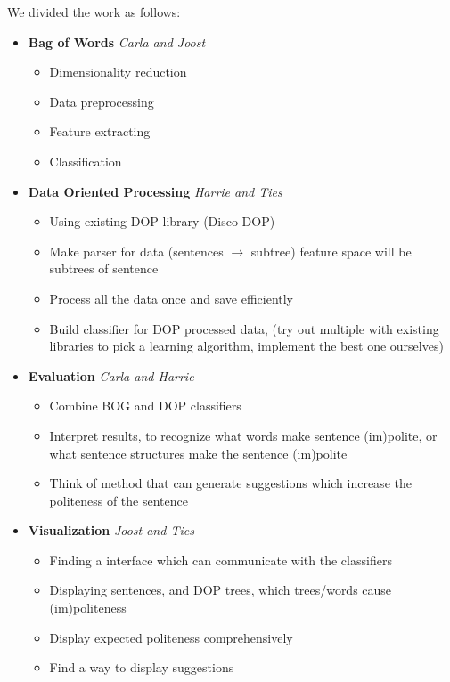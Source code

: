 \documentclass[11pt, english]{article}
\begin{document}
We divided the work as follows:
\begin{itemize}
\item \textbf{Bag of Words} \emph{Carla and Joost}
	\begin{itemize}
		\item Dimensionality reduction
		\item Data preprocessing
		\item Feature extracting
		\item Classification
	\end{itemize}

\item \textbf{Data Oriented Processing} \emph{Harrie and Ties}
	\begin{itemize}
		\item Using existing DOP library (Disco-DOP)
		\item Make parser for data (sentences $\rightarrow$ subtree) feature space will be subtrees of sentence
		\item Process all the data once and save efficiently
		\item Build classifier for DOP processed data, (try out multiple with existing libraries to pick a learning algorithm, implement the best one ourselves)
	\end{itemize}

\item \textbf{Evaluation} \emph{Carla and Harrie}
	\begin{itemize}
		\item Combine BOG and DOP classifiers
		\item Interpret results, to recognize what words make sentence (im)polite, or what sentence structures make the sentence (im)polite
		\item Think of method that can generate suggestions which increase the politeness of the sentence
	\end{itemize}

\item \textbf{Visualization} \emph{Joost and Ties}
	\begin{itemize}
		\item Finding a interface which can communicate with the classifiers
		\item Displaying sentences, and DOP trees, which trees/words cause (im)politeness
		\item Display expected politeness comprehensively
		\item Find a way to display suggestions
	\end{itemize}

\end{itemize}
\end{document}
